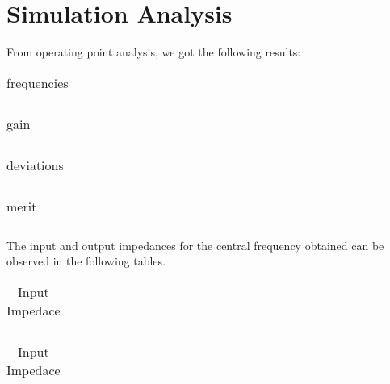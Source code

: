 \section{Simulation Analysis}
\label{sec:simulation} 

From operating point analysis, we got the following results:
\FloatBarrier
\begin{table}[h]
  \centering
  \begin{tabular}{|c|c|c|c|c|}
    \hline    
    
    \hline
  \end{tabular}
  \caption{frequencies}
  \label{tab:Spice1}
\end{table}
\FloatBarrier 

\begin{table}[h]
  \centering
  \begin{tabular}{|c|c|c|c|c|}
    \hline    
    
    \hline
  \end{tabular}
  \caption{gain}
  \label{tab:Spice1}
\end{table}
\FloatBarrier

\begin{table}[h]
  \centering
  \begin{tabular}{|c|c|c|c|c|}
    \hline    
    
    \hline
  \end{tabular}
  \caption{deviations}
  \label{tab:Spice1}
\end{table}
\FloatBarrier 

\begin{table}[h]
  \centering
  \begin{tabular}{|c|c|c|c|}
    \hline    
    
    \hline
  \end{tabular}
  \caption{merit}
  \label{tab:Spice1}
\end{table}
\FloatBarrier  

The input and output impedances for the central frequency obtained can be observed in the following tables.

\FloatBarrier
\begin{table}[h]
  \centering
  \begin{tabular}{|c|c|c|}
    \hline    
    
    \hline
  \end{tabular}
  \caption{Input Impedace}
  \label{tab:Spice1}
\end{table}
\FloatBarrier 
\begin{table}[h]
  \centering
  \begin{tabular}{|c|c|}
    \hline    
    
    \hline
  \end{tabular}
  \caption{Input Impedace}
  \label{tab:Spice1}
\end{table}
\FloatBarrier  

